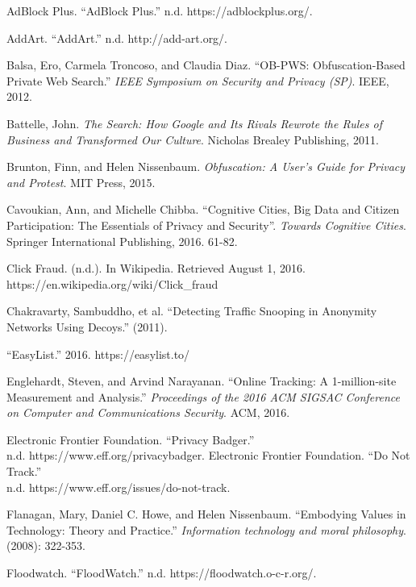 \documentclass[conference]{IEEEtran}
\begin{document}
\begin{thebibliography}{99}

 AdBlock Plus. “AdBlock Plus.” n.d. https://adblockplus.org/.

 AddArt. “AddArt.” n.d. http://add-art.org/.

 Balsa, Ero, Carmela Troncoso, and Claudia Diaz. ``OB-PWS: Obfuscation-Based Private Web Search.'' \textit{IEEE Symposium on Security and Privacy (SP)}. IEEE, 2012.

 Battelle, John. \textit{ The Search: How Google and Its Rivals Rewrote the Rules of Business and Transformed Our Culture}. Nicholas Brealey Publishing, 2011.

 Brunton, Finn, and Helen Nissenbaum. \textit{Obfuscation: A User's Guide for Privacy and Protest}. MIT Press, 2015.

 Cavoukian, Ann, and Michelle Chibba. “Cognitive Cities, Big Data and Citizen Participation: The Essentials of Privacy and Security”. \textit{Towards Cognitive Cities}. Springer International Publishing, 2016. 61-82.

 Click Fraud. (n.d.). In Wikipedia. Retrieved August 1, 2016. https://en.wikipedia.org/wiki/Click\_fraud

 Chakravarty, Sambuddho, et al. “Detecting Traffic Snooping in Anonymity Networks Using Decoys.” (2011).

 “EasyList.” 2016. https://easylist.to/

 Englehardt, Steven, and Arvind Narayanan. “Online Tracking: A 1-million-site Measurement and Analysis.” \textit{Proceedings of the 2016 ACM SIGSAC Conference on Computer and Communications Security}. ACM, 2016.

 Electronic Frontier Foundation. “Privacy Badger.”\\n.d. https://www.eff.org/privacybadger.
 Electronic Frontier Foundation. “Do Not Track.”\\n.d. https://www.eff.org/issues/do-not-track.

 Flanagan, Mary, Daniel C. Howe, and Helen Nissenbaum. “Embodying Values in Technology: Theory and Practice.” \textit{Information technology and moral philosophy}. (2008): 322-353.

 Floodwatch. “FloodWatch.” n.d. https://floodwatch.o-c-r.org/.


\end{thebibliography}
\end{document}
